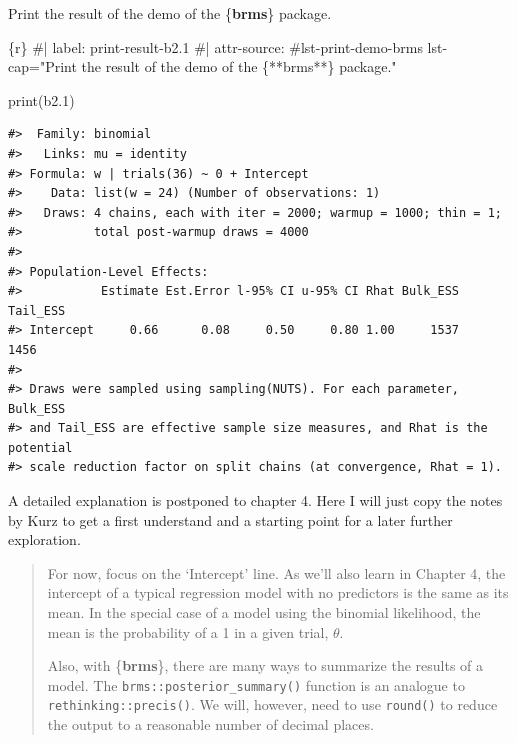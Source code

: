 \documentclass[
  letterpaper,
  DIV=11,
  numbers=noendperiod]{scrreprt}
\newenvironment{Shaded}{\begin{snugshade}}{\end{snugshade}}
\newcommand{\CommentTok}[1]{\textcolor[rgb]{0.37,0.37,0.37}{#1}}
\newcommand{\FloatTok}[1]{\textcolor[rgb]{0.68,0.00,0.00}{#1}}
\newcommand{\FunctionTok}[1]{\textcolor[rgb]{0.28,0.35,0.67}{#1}}
\newcommand{\InformationTok}[1]{\textcolor[rgb]{0.37,0.37,0.37}{#1}}
\newcommand{\NormalTok}[1]{\textcolor[rgb]{0.00,0.23,0.31}{#1}}
\begin{document}
\begin{codelisting}

\caption{Print the result of the demo of the \{\textbf{brms}\} package.}

\hypertarget{lst-print-demo-brms}{%
\label{lst-print-demo-brms}}%
\begin{Shaded}
\begin{Highlighting}[]
\InformationTok{\textasciigrave{}\textasciigrave{}\textasciigrave{}\{r\}}
\CommentTok{\#| label: print{-}result{-}b2.1}
\CommentTok{\#| attr{-}source: \textquotesingle{}\#lst{-}print{-}demo{-}brms lst{-}cap="Print the result of the demo of the \{**brms**\} package."\textquotesingle{}}

\FunctionTok{print}\NormalTok{(b2}\FloatTok{.1}\NormalTok{)}
\InformationTok{\textasciigrave{}\textasciigrave{}\textasciigrave{}}
\end{Highlighting}
\end{Shaded}

\end{codelisting}

\begin{verbatim}
#>  Family: binomial 
#>   Links: mu = identity 
#> Formula: w | trials(36) ~ 0 + Intercept 
#>    Data: list(w = 24) (Number of observations: 1) 
#>   Draws: 4 chains, each with iter = 2000; warmup = 1000; thin = 1;
#>          total post-warmup draws = 4000
#> 
#> Population-Level Effects: 
#>           Estimate Est.Error l-95% CI u-95% CI Rhat Bulk_ESS Tail_ESS
#> Intercept     0.66      0.08     0.50     0.80 1.00     1537     1456
#> 
#> Draws were sampled using sampling(NUTS). For each parameter, Bulk_ESS
#> and Tail_ESS are effective sample size measures, and Rhat is the potential
#> scale reduction factor on split chains (at convergence, Rhat = 1).
\end{verbatim}

A detailed explanation is postponed to chapter 4. Here I will just copy
the notes by Kurz to get a first understand and a starting point for a
later further exploration.

\begin{quote}
For now, focus on the `Intercept' line. As we'll also learn in Chapter
4, the intercept of a typical regression model with no predictors is the
same as its mean. In the special case of a model using the binomial
likelihood, the mean is the probability of a 1 in a given trial,
\(\theta\).

Also, with \{\textbf{brms}\}, there are many ways to summarize the
results of a model. The \texttt{brms::posterior\_summary()} function is
an analogue to \texttt{rethinking::precis()}. We will, however, need to
use \texttt{round()} to reduce the output to a reasonable number of
decimal places.
\end{quote}
\end{document}
